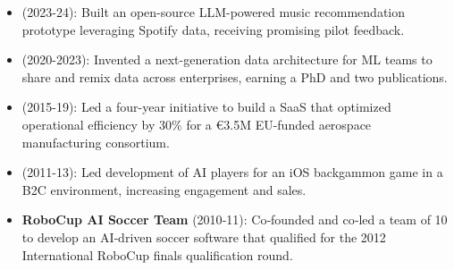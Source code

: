 \begin{itemize}

\item {} (2023-24): Built an open-source LLM-powered music recommendation prototype leveraging Spotify data, receiving promising pilot feedback.

\item {} (2020-2023): Invented a next-generation data architecture for ML teams to share and remix data across enterprises, earning a PhD and two publications.

\item {} (2015-19): Led a four-year initiative to build a SaaS that optimized operational efficiency by 30\% for a €3.5M EU-funded aerospace manufacturing consortium.

\item {} (2011-13): Led development of AI players for an iOS backgammon game in a B2C environment, increasing engagement and sales.

\item \textbf{RoboCup AI Soccer Team} (2010‑11): Co‑founded and co‑led a team of 10 to develop an AI‑driven soccer software that qualified for the 2012 International RoboCup finals qualification round.





\end{itemize}
